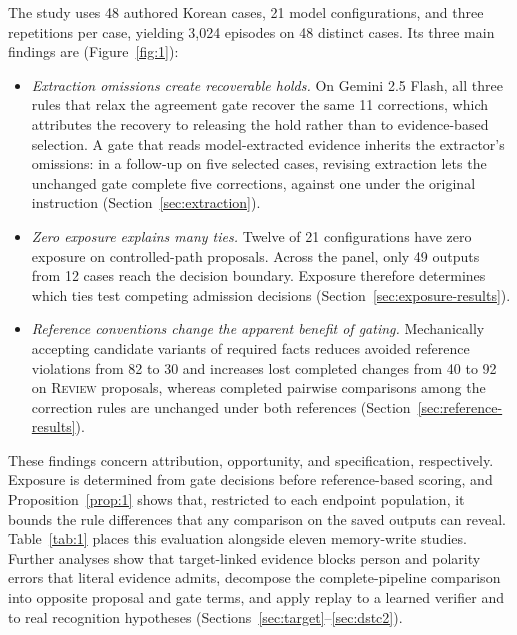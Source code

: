\documentclass[acmsmall,review,anonymous]{acmart}
\newcommand{\review}{\textsc{Review}}
\begin{document}
The study uses 48 authored Korean cases, 21 model configurations, and three repetitions per case, yielding 3,024 episodes on 48 distinct cases. Its three main findings are (Figure~\ref{fig:1}):
\begin{itemize}
\item \emph{Extraction omissions create recoverable holds.} On Gemini 2.5 Flash, all three rules that relax the agreement gate recover the same 11 corrections, which attributes the recovery to releasing the hold rather than to evidence-based selection. A gate that reads model-extracted evidence inherits the extractor's omissions: in a follow-up on five selected cases, revising extraction lets the unchanged gate complete five corrections, against one under the original instruction (Section~\ref{sec:extraction}).
\item \emph{Zero exposure explains many ties.} Twelve of 21 configurations have zero exposure on controlled-path proposals. Across the panel, only 49 outputs from 12 cases reach the decision boundary. Exposure therefore determines which ties test competing admission decisions (Section~\ref{sec:exposure-results}).
\item \emph{Reference conventions change the apparent benefit of gating.} Mechanically accepting candidate variants of required facts reduces avoided reference violations from 82 to 30 and increases lost completed changes from 40 to 92 on \review{} proposals, whereas completed pairwise comparisons among the correction rules are unchanged under both references (Section~\ref{sec:reference-results}).
\end{itemize}

These findings concern attribution, opportunity, and specification, respectively. Exposure is determined from gate decisions before reference-based scoring, and Proposition~\ref{prop:1} shows that, restricted to each endpoint population, it bounds the rule differences that any comparison on the saved outputs can reveal. Table~\ref{tab:1} places this evaluation alongside eleven memory-write studies. Further analyses show that target-linked evidence blocks person and polarity errors that literal evidence admits, decompose the complete-pipeline comparison into opposite proposal and gate terms, and apply replay to a learned verifier and to real recognition hypotheses (Sections~\ref{sec:target}--\ref{sec:dstc2}).
\end{document}
